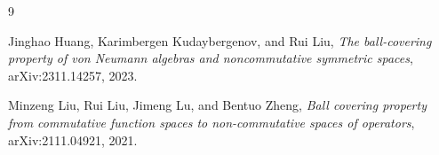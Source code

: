 \documentclass[11pt]{article}
\begin{document}
\begin{thebibliography}{9}

Jinghao Huang, Karimbergen Kudaybergenov, and Rui Liu,
\emph{The ball-covering property of von Neumann algebras and noncommutative
symmetric spaces},
arXiv:2311.14257, 2023.

Minzeng Liu, Rui Liu, Jimeng Lu, and Bentuo Zheng,
\emph{Ball covering property from commutative function spaces to
non-commutative spaces of operators},
arXiv:2111.04921, 2021.

\end{thebibliography}
\end{document}
